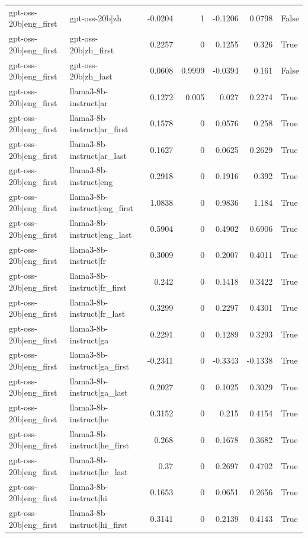 \begin{table}
\begin{tabular}{l l r r r r l}
gpt-oss-20b|eng_first & gpt-oss-20b|zh & -0.0204 & 1 & -0.1206 & 0.0798 & False \\
gpt-oss-20b|eng_first & gpt-oss-20b|zh_first & 0.2257 & 0 & 0.1255 & 0.326 & True \\
gpt-oss-20b|eng_first & gpt-oss-20b|zh_last & 0.0608 & 0.9999 & -0.0394 & 0.161 & False \\
gpt-oss-20b|eng_first & llama3-8b-instruct|ar & 0.1272 & 0.005 & 0.027 & 0.2274 & True \\
gpt-oss-20b|eng_first & llama3-8b-instruct|ar_first & 0.1578 & 0 & 0.0576 & 0.258 & True \\
gpt-oss-20b|eng_first & llama3-8b-instruct|ar_last & 0.1627 & 0 & 0.0625 & 0.2629 & True \\
gpt-oss-20b|eng_first & llama3-8b-instruct|eng & 0.2918 & 0 & 0.1916 & 0.392 & True \\
gpt-oss-20b|eng_first & llama3-8b-instruct|eng_first & 1.0838 & 0 & 0.9836 & 1.184 & True \\
gpt-oss-20b|eng_first & llama3-8b-instruct|eng_last & 0.5904 & 0 & 0.4902 & 0.6906 & True \\
gpt-oss-20b|eng_first & llama3-8b-instruct|fr & 0.3009 & 0 & 0.2007 & 0.4011 & True \\
gpt-oss-20b|eng_first & llama3-8b-instruct|fr_first & 0.242 & 0 & 0.1418 & 0.3422 & True \\
gpt-oss-20b|eng_first & llama3-8b-instruct|fr_last & 0.3299 & 0 & 0.2297 & 0.4301 & True \\
gpt-oss-20b|eng_first & llama3-8b-instruct|ga & 0.2291 & 0 & 0.1289 & 0.3293 & True \\
gpt-oss-20b|eng_first & llama3-8b-instruct|ga_first & -0.2341 & 0 & -0.3343 & -0.1338 & True \\
gpt-oss-20b|eng_first & llama3-8b-instruct|ga_last & 0.2027 & 0 & 0.1025 & 0.3029 & True \\
gpt-oss-20b|eng_first & llama3-8b-instruct|he & 0.3152 & 0 & 0.215 & 0.4154 & True \\
gpt-oss-20b|eng_first & llama3-8b-instruct|he_first & 0.268 & 0 & 0.1678 & 0.3682 & True \\
gpt-oss-20b|eng_first & llama3-8b-instruct|he_last & 0.37 & 0 & 0.2697 & 0.4702 & True \\
gpt-oss-20b|eng_first & llama3-8b-instruct|hi & 0.1653 & 0 & 0.0651 & 0.2656 & True \\
gpt-oss-20b|eng_first & llama3-8b-instruct|hi_first & 0.3141 & 0 & 0.2139 & 0.4143 & True \\

\end{tabular}
\end{table}
